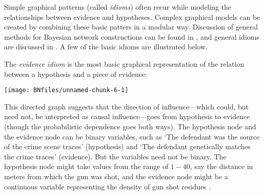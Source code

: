 \documentclass{article}
\begin{document}
Simple graphical patterns (called \emph{idioms}) often recur while modeling the relationships between evidence and hypotheses. Complex graphical models can be created by combining these basic patters 
in a modular way. Discussion of general methods for Bayesian network constructions can be found in \citep{neil2000BuildingLargescaleBayesian},
\citep{hepler2007ObjectorientedGraphicalRepresentations} and general idioms are discussed in \citep{fenton2013GeneralStructureLegal}. A few of the basic idioms
are illustrated below.

The \emph{evidence idiom} is the most basic graphical representation of the relation between a hypothesis and a piece of evidence:

\begin{center}\texttt{[image: BNfiles/unnamed-chunk-6-1]} \end{center}

\noindent 
This directed graph suggests that the direction of influence---which could, but need not, be interpreted as causal influence---goes from hypothesis to evidence (though the probabilistic dependence goes both ways). 
The hypothesis node and the evidence node can be binary variables, such as
`The defendant was the
source of the crime scene traces' (hypothesis) and `The defendant genetically matches the crime traces' (evidence). But the variables need not be binary. The hypothesis node might take values from the range of \(1-40\), say the distance in meters from which the gun was shot, and the evidence node might be a continuous variable representing the density of gun shot residues  %
\citep{taroni2006bayesian}.


\end{document}
